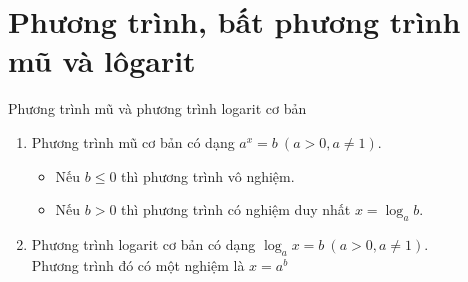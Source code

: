 \section{Phương trình, bất phương trình mũ và lôgarit}

\begin{dang}{Phương trình mũ và phương trình logarit cơ bản}
	\begin{enumerate}
		\item Phương trình mũ cơ bản có dạng $a^x=b\ \left(a>0,a\neq 1\right)$.
		\begin{itemize}
			\item Nếu $b\le0$ thì phương trình vô nghiệm.
			\item Nếu $b>0$ thì phương trình có nghiệm duy nhất $x=\log_a b$. 
		\end{itemize}
		\item Phương trình logarit cơ bản có dạng $\log_a x=b\ \left(a>0,a\neq 1\right)$.\\ 
		Phương trình đó có một nghiệm là $x=a^b$
	\end{enumerate}
	
	
\end{dang}
